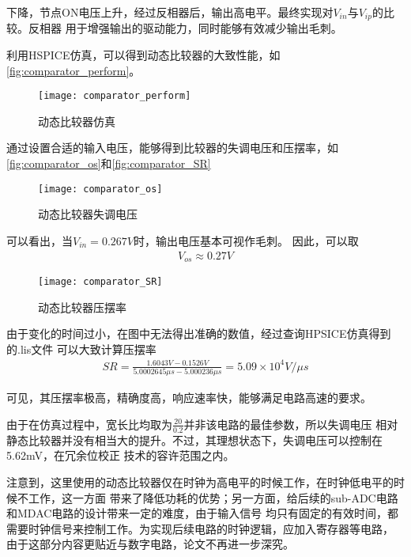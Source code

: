     下降，节点ON电压上升，经过反相器后，输出高电平。最终实现对$ V_{in} $与$ V_{ip} $的比较。反相器
    用于增强输出的驱动能力，同时能够有效减少输出毛刺。
    \par 利用HSPICE仿真，可以得到动态比较器的大致性能，如\autoref{fig:comparator_perform}。
    \begin{figure}[H]
        \centering
        \texttt{[image: comparator\_perform]}
        \caption{\label{fig:comparator_perform}动态比较器仿真}
    \end{figure}
    \par 通过设置合适的输入电压，能够得到比较器的失调电压和压摆率，如\autoref{fig:comparator_os}和\autoref{fig:comparator_SR}
    \begin{figure}[H]
        \centering
        \texttt{[image: comparator\_os]}
        \caption{\label{fig:comparator_os}动态比较器失调电压}
    \end{figure}
    \par 可以看出，当$ V_{in} = 0.267V $时，输出电压基本可视作毛刺。
    因此，可以取
    \begin{align}
        V_{os} \approx 0.27V
    \end{align}
    \begin{figure}[H]
        \centering
        \texttt{[image: comparator\_SR]}
        \caption{\label{fig:comparator_SR}动态比较器压摆率}
    \end{figure}
    \par 由于变化的时间过小，在图中无法得出准确的数值，经过查询HPSICE仿真得到的.lis文件
    可以大致计算压摆率
    \begin{align}
        SR = \frac{1.6043V-0.1526V}{5.0002645\mu s-5.000236\mu s} = 5.09\times10^{4}V/\mu s
    \end{align}
    \par 可见，其压摆率极高，精确度高，响应速率快，能够满足电路高速的要求。
    \par 由于在仿真过程中，宽长比均取为$ \frac{20}{0.2} $并非该电路的最佳参数，所以失调电压
    相对静态比较器并没有相当大的提升。不过，其理想状态下，失调电压可以控制在5.62mV，在冗余位校正
    技术的容许范围之内。
    \par 注意到，这里使用的动态比较器仅在时钟为高电平的时候工作，在时钟低电平的时候不工作，这一方面
    带来了降低功耗的优势；另一方面，给后续的sub-ADC电路和MDAC电路的设计带来一定的难度，由于输入信号
    均只有固定的有效时间，都需要时钟信号来控制工作。为实现后续电路的时钟逻辑，应加入寄存器等电路，
    由于这部分内容更贴近与数字电路，论文不再进一步深究。

